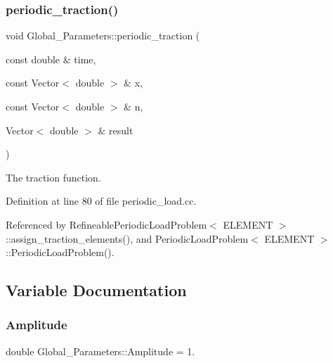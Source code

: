 \mbox{\label{namespaceGlobal__Parameters_a003c4c942a4c8b88b417f139fc5c637c}} 
\subsubsection{\texorpdfstring{periodic\+\_\+traction()}{periodic\_traction()}}
{\footnotesize\ttfamily void Global\+\_\+\+Parameters\+::periodic\+\_\+traction (\begin{DoxyParamCaption}\item[{const double \&}]{time,  }\item[{const Vector$<$ double $>$ \&}]{x,  }\item[{const Vector$<$ double $>$ \&}]{n,  }\item[{Vector$<$ double $>$ \&}]{result }\end{DoxyParamCaption})}



The traction function. 



Definition at line 80 of file periodic\+\_\+load.\+cc.



Referenced by Refineable\+Periodic\+Load\+Problem$<$ E\+L\+E\+M\+E\+N\+T $>$\+::assign\+\_\+traction\+\_\+elements(), and Periodic\+Load\+Problem$<$ E\+L\+E\+M\+E\+N\+T $>$\+::\+Periodic\+Load\+Problem().



\subsection{Variable Documentation}
\mbox{\label{namespaceGlobal__Parameters_a184a9ddf15137a1b11ccf7dc790d697d}} 
\subsubsection{\texorpdfstring{Amplitude}{Amplitude}}
{\footnotesize\ttfamily double Global\+\_\+\+Parameters\+::\+Amplitude = 1.}



